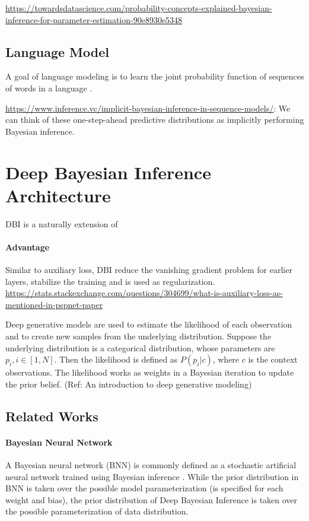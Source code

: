 \documentclass{article}
\begin{document}
\url{https://towardsdatascience.com/probability-concepts-explained-bayesian-inference-for-parameter-estimation-90e8930e5348}


\subsection{Language Model}

A goal of language modeling is to learn the joint probability function of sequences of words in a language \citep{bengio2000neural}.


\url{https://www.inference.vc/implicit-bayesian-inference-in-sequence-models/}:
We can think of these one-step-ahead predictive distributions as implicitly performing Bayesian inference.


\section{Deep Bayesian Inference Architecture}

DBI is a naturally extension of 

\paragraph{Advantage} 
Similar to auxiliary loss, DBI reduce the vanishing gradient problem for earlier layers, stabilize the training and is used as regularization.
\url{https://stats.stackexchange.com/questions/304699/what-is-auxiliary-loss-as-mentioned-in-pspnet-paper}

Deep generative models are used to estimate the likelihood of each observation and to create new samples from the underlying distribution.
Suppose the underlying distribution is a categorical distribution, whose parameters are $p_i, i \in [1, N]$.
Then the likelihood is defined as $P(p_i | c)$, where $c$ is the context observations.
The likelihood works as weights in a Bayesian iteration to update the prior belief.
(Ref: An introduction to deep generative modeling)


\subsection{Related Works}

\paragraph{Bayesian Neural Network}
A Bayesian neural network (BNN) is commonly defined as a stochastic artificial neural network trained using Bayesian inference \citep{jospin2022hands}.
While the prior distribution in BNN is taken over the possible model parameterization (is specified for each weight and bias),
the prior distribution of Deep Bayesian Inference is taken over the possible parameterization of data distribution.
\end{document}

